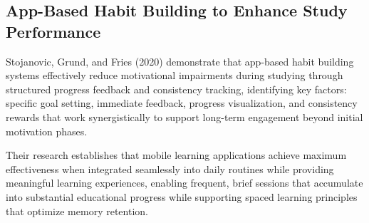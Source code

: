 \subsection{App-Based Habit Building to Enhance Study Performance}

Stojanovic, Grund, and Fries (2020) demonstrate that app-based habit building systems effectively reduce motivational impairments during studying through structured progress feedback and consistency tracking, identifying key factors: specific goal setting, immediate feedback, progress visualization, and consistency rewards that work synergistically to support long-term engagement beyond initial motivation phases.

Their research establishes that mobile learning applications achieve maximum effectiveness when integrated seamlessly into daily routines while providing meaningful learning experiences, enabling frequent, brief sessions that accumulate into substantial educational progress while supporting spaced learning principles that optimize memory retention.


